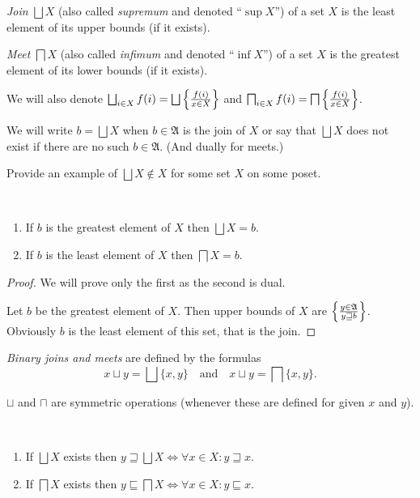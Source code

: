 \begin{defn}
\emph{Join} $\bigsqcup X$ (also called
\emph{supremum} and denoted ``$\sup X$'') of a set $X$ is the
least element of its upper bounds (if it exists).
\end{defn}

\begin{defn}
\emph{Meet} $\bigsqcap X$ (also called
\emph{infimum} and denoted ``$\inf X$'') of a set $X$ is the greatest
element of its lower bounds (if it exists).
\end{defn}
We will also denote $\bigsqcup_{i\in X}f(i)=\bigsqcup\setcond{f(i)}{x\in X}$
and $\bigsqcap_{i\in X}f(i)=\bigsqcap\left\{ \frac{f(i)}{x\in X}\right\}$.

We will write $b=\bigsqcup X$ when $b\in\mathfrak{A}$ is the join
of $X$ or say that $\bigsqcup X$ does not exist if there are no
such $b\in\mathfrak{A}$. (And dually for meets.)
\begin{xca}
Provide an example of $\bigsqcup X\notin X$ for some set $X$ on
some poset.\end{xca}
\begin{prop}
~
\begin{enumerate}
\item If $b$ is the greatest element of $X$ then $\bigsqcup X=b$.
\item If $b$ is the least element of $X$ then $\bigsqcap X=b$.
\end{enumerate}
\end{prop}
\begin{proof}
We will prove only the first as the second is dual.

Let $b$ be the greatest element of $X$. Then upper bounds of $X$
are $\left\{ \frac{y\in\mathfrak{A}}{y\sqsupseteq b}\right\}$. Obviously $b$
is the least element of this set, that is the join.\end{proof}
\begin{defn}
\emph{Binary joins and meets} are defined by the
formulas
\[
x\sqcup y=\bigsqcup\{x,y\}\quad\text{and}\quad x\sqcup y=\bigsqcap\{x,y\}.
\]
\end{defn}
\begin{obvious}
$\sqcup$ and $\sqcap$ are symmetric operations (whenever these are
defined for given $x$ and $y$).\end{obvious}
\begin{thm}
~
\begin{enumerate}
\item If $\bigsqcup X$ exists then $y\sqsupseteq\bigsqcup X\Leftrightarrow\forall x\in X:y\sqsupseteq x$.
\item If $\bigsqcap X$ exists then $y\sqsubseteq\bigsqcap X\Leftrightarrow\forall x\in X:y\sqsubseteq x$.
\end{enumerate}
\end{thm}
